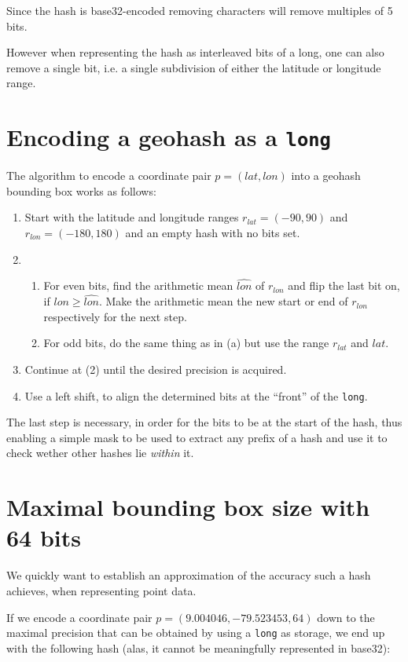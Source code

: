 \documentclass[a4paper,11pt,twoside]{scrartcl}
\begin{document}
Since the hash is base32-encoded removing characters will remove multiples of 5 bits.

However when representing the hash as interleaved bits of a long, one can also remove a single bit, i.e. a single subdivision of either the latitude or longitude range.

\section{Encoding a geohash as a \texttt{long}} %
\label{sec:encoding_a_geohash_as_a_}
The algorithm to encode a coordinate pair $p = (lat,lon)$ into a geohash bounding box works as follows:

\begin{enumerate}
	\item Start with the latitude and longitude ranges $r_{lat} = (-90,90)$ and $r_{lon} = (-180,180)$ and an empty hash with no bits set.
	\item \begin{enumerate}
		\item For even bits, find the arithmetic mean $\hat{lon}$ of $r_{lon}$ and flip the last bit on, if $lon \geq \hat{lon}$. Make the arithmetic mean the new start or end of $r_{lon}$ respectively for the next step.
		\item For odd bits, do the same thing as in (a) but use the range $r_{lat}$ and $lat$.
	\end{enumerate}
	\item Continue at (2) until the desired precision is acquired.
	\item Use a left shift, to align the determined bits at the “front” of the \texttt{long}.
\end{enumerate}

The last step is necessary, in order for the bits to be at the start of the hash, thus enabling a simple mask to be used to extract any prefix of a hash and use it to check wether other hashes lie \emph{within} it.


\section{Maximal bounding box size with 64 bits} %
\label{sec:maximal_precision_with_64_bits}
We quickly want to establish an approximation of the accuracy such a hash achieves, when representing point data.

If we encode a coordinate pair $p = (9.004046, -79.523453, 64)$ down to the maximal precision that can be obtained by using a \texttt{long} as storage, we end up with the following hash (alas, it cannot be meaningfully represented in base32):
\end{document}
